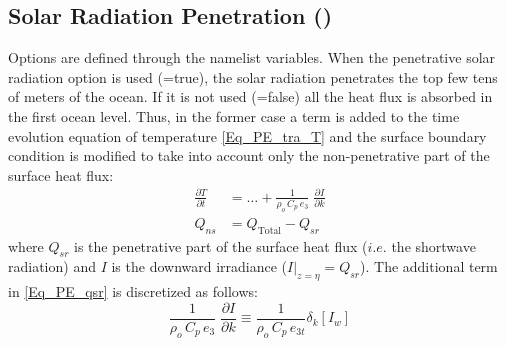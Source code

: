 \documentclass[NEMO_book]{subfiles}
\begin{document}
\subsection   [Solar Radiation Penetration (\textit{traqsr})]
			{Solar Radiation Penetration ()}
\label{TRA_qsr}

Options are defined through the   namelist variables.
When the penetrative solar radiation option is used (=true), 
the solar radiation penetrates the top few tens of meters of the ocean. If it is not used 
(=false) all the heat flux is absorbed in the first ocean level. 
Thus, in the former case a term is added to the time evolution equation of 
temperature \eqref{Eq_PE_tra_T} and the surface boundary condition is 
modified to take into account only the non-penetrative part of the surface 
heat flux:
\begin{equation} \label{Eq_PE_qsr}
\begin{split}
\frac{\partial T}{\partial t} &= {\ldots} + \frac{1}{\rho_o\, C_p \,e_3} \; \frac{\partial I}{\partial k}	\\
Q_{ns} &= Q_\text{Total} - Q_{sr}
\end{split}
\end{equation}
where $Q_{sr}$ is the penetrative part of the surface heat flux ($i.e.$ the shortwave radiation) 
and $I$ is the downward irradiance ($\left. I \right|_{z=\eta}=Q_{sr}$). 
The additional term in \eqref{Eq_PE_qsr} is discretized as follows:
\begin{equation} \label{Eq_tra_qsr}
\frac{1}{\rho_o\, C_p \,e_3} \; \frac{\partial I}{\partial k} \equiv \frac{1}{\rho_o\, C_p\, e_{3t}} \delta_k \left[ I_w \right]
\end{equation}
\end{document}
